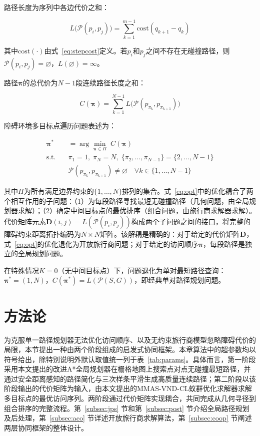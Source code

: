 \documentclass[lettersize,journal]{IEEEtran}
\begin{document}
路径长度为序列中各边代价之和：

\begin{equation}
L\big(\mathcal{P}(p_i, p_j)\big) = \sum_{k=1}^{m-1} \mathrm{cost}(q_{k+1} - q_k)
\label{eq:pathlen}
\end{equation}

其中$\mathrm{cost}(\cdot)$由式~\textcolor{blue}{\eqref{eq:stepcost}}定义。若$p_i$和$p_j$之间不存在无碰撞路径，则$\mathcal{P}(p_i, p_j) = \varnothing$，$L(\varnothing) = \infty$。

路径$\bm{\pi}$的总代价为$N-1$段连续路径长度之和：

\begin{equation}
C(\bm{\pi}) = \sum_{k=1}^{N-1} L\big(\mathcal{P}(p_{\pi_k}, p_{\pi_{k+1}})\big)
\label{eq:totalcost}
\end{equation}

障碍环境多目标点遍历问题表述为：

\begin{align}
\bm{\pi}^{*} &= \arg\min_{\bm{\pi} \in \Pi} \; C(\bm{\pi})
\label{eq:opt}\\
\text{s.t.} \quad &\pi_1 = 1,\; \pi_N = N,\; \{\pi_2, \dots, \pi_{N-1}\} = \{2, \dots, N-1\} \nonumber\\
&\mathcal{P}(p_{\pi_k}, p_{\pi_{k+1}}) \neq \varnothing \quad \forall k \in \{1, \dots, N-1\} \nonumber
\end{align}

其中$\Pi$为所有满足边界约束的$\{1, \dots, N\}$排列的集合。式~\textcolor{blue}{\eqref{eq:opt}}中的优化耦合了两个相互作用的子问题：（1）为每段路径寻找最短无碰撞路径（几何问题，由全局规划器求解）；（2）确定中间目标点的最优排序（组合问题，由旅行商求解器求解）。代价矩阵元素$\mathbf{D}(i, j) = L(\mathcal{P}(p_i, p_j))$构成两个子问题之间的接口，将完整的障碍约束距离拓扑编码为$N \times N$矩阵。该解耦是精确的：对于给定的代价矩阵$\mathbf{D}$，式~\textcolor{blue}{\eqref{eq:opt}}的优化退化为开放旅行商问题；对于给定的访问顺序$\bm{\pi}$，每段路径是独立的全局规划问题。

在特殊情况$K = 0$（无中间目标点）下，问题退化为单对最短路径查询：$\bm{\pi}^{*} = (1, N)$，$C(\bm{\pi}^{*}) = L(\mathcal{P}(S, G))$，即经典单对路径规划问题。

\section{方法论}

\label{sec:method}

为克服单一路径规划器无法优化访问顺序、以及无约束旅行商模型忽略障碍代价的局限，本节提出一种由两个阶段组成的启发式协同框架。本章算法中的超参数均以符号给出，除特别说明外默认取值统一列于表~\textcolor{blue}{\ref{tab:params}}。具体而言，第一阶段采用本文提出的改进A*全局规划器在栅格地图上搜索点对点无碰撞最短路径，并通过安全距离感知的路径简化与三次样条平滑生成高质量连续路径；第二阶段以该阶段输出的代价矩阵为输入，由本文提出的MMAS-VND-CL蚁群优化求解器求解多目标点的最优访问序列。两阶段通过代价矩阵实现耦合，共同完成从几何寻径到组合排序的完整流程。第~\textcolor{blue}{\ref{subsec:jps}} 节和第~\textcolor{blue}{\ref{subsec:post}} 节介绍全局路径规划及后处理，第~\textcolor{blue}{\ref{subsec:aco}} 节详述开放旅行商求解算法，第~\textcolor{blue}{\ref{subsec:coop}} 节阐述两层协同框架的整体设计。
\end{document}
